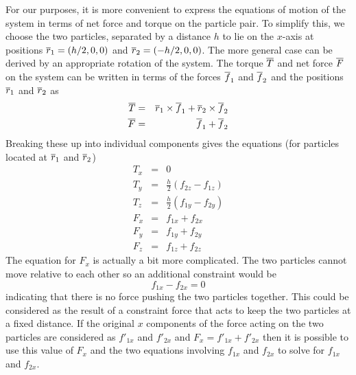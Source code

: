 \documentclass[12pt]{article}
\begin{document}
For our purposes, it is more convenient to express the equations of motion of the
system in terms of net force and torque on the particle pair. To simplify this, we
choose the two particles, separated by a distance $h$ to lie on the $x$-axis at
positions $\overline{r}_1 = (h/2,0,0)$ and $\overline{r}_2 = (-h/2,0,0)$. The more general case
can be derived by an appropriate rotation of the system. The torque $\overline{T}$ and
net force $\overline{F}$ on the system can be written in terms of the forces $\overline{f}_1$
and $\overline{f}_2$ and the positions $\overline{r}_1$ and $\overline{r}_2$ as
\begin{eqnarray*}
\overline{T} & = & \overline{r}_1\times\overline{f}_1 + \overline{r}_2\times\overline{f}_2 \\
\overline{F} & = & \overline{f}_1 + \overline{f}_2
\end{eqnarray*}
Breaking these up into individual components gives the equations (for particles
located at $\overline{r}_1$ and $\overline{r}_2$)
\begin{eqnarray*}
T_x & = & 0 \\
T_y & = & \frac{h}{2}(f_{2z}-f_{1z}) \\
T_z & = & \frac{h}{2}(f_{1y}-f_{2y}) \\
F_x & = & f_{1x} + f_{2x} \\
F_y & = & f_{1y} + f_{2y} \\
F_z & = & f_{1z} + f_{2z}
\end{eqnarray*}
The equation for $F_x$ is actually a bit more complicated. The two particles
cannot move relative to each other so an additional constraint would be
\[
f_{1x}-f_{2x} = 0
\]
indicating that there is no force pushing the two particles together. This could
be considered as the result of a constraint force that acts to keep the two particles
at a fixed distance. If the original $x$ components of the force acting on the two
particles are considered as $f'_{1x}$ and $f'_{2x}$ and $F_x = f'_{1x} + f'_{2x}$
then it is possible to use this value of $F_x$ and the two equations involving
$f_{1x}$ and $f_{2x}$ to solve for $f_{1x}$ and $f_{2x}$.
\end{document}
